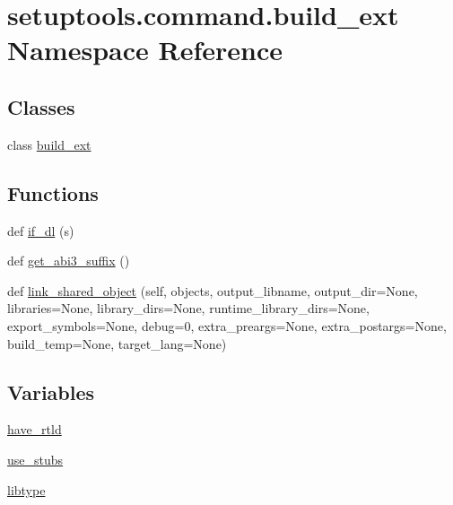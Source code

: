 \hypertarget{namespacesetuptools_1_1command_1_1build__ext}{}\section{setuptools.\+command.\+build\+\_\+ext Namespace Reference}
\label{namespacesetuptools_1_1command_1_1build__ext}
\subsection*{Classes}
\begin{DoxyCompactItemize}
\item 
class \hyperlink{classsetuptools_1_1command_1_1build__ext_1_1build__ext}{build\+\_\+ext}
\end{DoxyCompactItemize}
\subsection*{Functions}
\begin{DoxyCompactItemize}
\item 
def \hyperlink{namespacesetuptools_1_1command_1_1build__ext_af34b48975457400892e13e5e52f352aa}{if\+\_\+dl} (s)
\item 
def \hyperlink{namespacesetuptools_1_1command_1_1build__ext_ae6906ec7a016e0980a3d09aaacbc0489}{get\+\_\+abi3\+\_\+suffix} ()
\item 
def \hyperlink{namespacesetuptools_1_1command_1_1build__ext_af6495dcefb19a333c4fba87af82b45c6}{link\+\_\+shared\+\_\+object} (self, objects, output\+\_\+libname, output\+\_\+dir=None, libraries=None, library\+\_\+dirs=None, runtime\+\_\+library\+\_\+dirs=None, export\+\_\+symbols=None, debug=0, extra\+\_\+preargs=None, extra\+\_\+postargs=None, build\+\_\+temp=None, target\+\_\+lang=None)
\end{DoxyCompactItemize}
\subsection*{Variables}
\begin{DoxyCompactItemize}
\item 
\hyperlink{namespacesetuptools_1_1command_1_1build__ext_a5ed03ad14d556bf6095784ca350772e7}{have\+\_\+rtld}
\item 
\hyperlink{namespacesetuptools_1_1command_1_1build__ext_a5f734b107b494b1b3c14089cb6087e65}{use\+\_\+stubs}
\item 
\hyperlink{namespacesetuptools_1_1command_1_1build__ext_a73fa9ca2f0d8e09352213b43802026ef}{libtype}
\end{DoxyCompactItemize}


